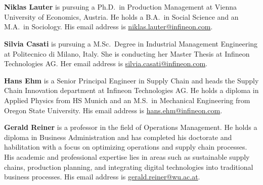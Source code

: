 \documentclass[preprint,12pt,authoryear]{elsarticle}
\begin{document}
    
    

\newpage
\section*{ }\label{sec:Author short Biography}

    \noindent \textbf{Niklas Lauter} is pursuing a Ph.D.\ in Production Management at Vienna University of Economics, Austria. He holds a B.A.\ in Social Science and an M.A.\ in Sociology. His email address is \href{mailto:niklas.lauter@infineon.com}{niklas.lauter@infineon.com}.
    
    \vspace{1em} 
    \noindent \textbf{Silvia Casati} is pursuing a M.Sc.\ Degree in Industrial Management Engineering at Politecnico di Milano, Italy. She is conducting her Master Thesis at Infineon Technologies AG\@. Her email address is \href{mailto:nsilvia.casati@infineon.com}{silvia.casati@infineon.com}.
    
    \vspace{1em} 
    \noindent \textbf{Hans Ehm} is a Senior Principal Engineer in Supply Chain and heads the Supply Chain Innovation department at Infineon Technologies AG\@. He holds a diploma in Applied Physics from HS Munich and an M.S.\ in Mechanical Engineering from Oregon State University. His email address is \href{mailto:hans.ehm@infineon.com}{hans.ehm@infineon.com}.
    
    \vspace{1em} 
    \noindent \textbf{Gerald Reiner} is a professor in the field of Operations Management. He holds a diploma in Business Administration and has completed his doctorate and habilitation with a focus on optimizing operations and supply chain processes. His academic and professional expertise lies in areas such as sustainable supply chains, production planning, and integrating digital technologies into traditional business processes. His email address is \href{mailto:gerald.reiner@wu.ac.at}{gerald.reiner@wu.ac.at}.\\
\end{document}
